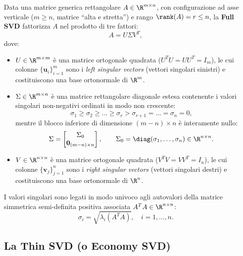 Data una matrice generica rettangolare $A \in \R^{m \times n}$, con configurazione ad asse verticale ($m \ge n$, matrice ``alta e stretta'') e rango $\rank(A) = r \le n$, la \textbf{Full SVD} fattorizza $A$ nel prodotto di tre fattori:
\begin{equation}
    A = U \Sigma V^T,
\end{equation}
dove:
\begin{itemize}
    \item $U \in \R^{m \times m}$ \`e una matrice ortogonale quadrata ($U^T U = U U^T = I_m$), le cui colonne $\{\mathbf{u}_i\}_{i=1}^m$ sono i \textit{left singular vectors} (vettori singolari sinistri) e costituiscono una base ortonormale di $\R^m$.
    \item $\Sigma \in \R^{m \times n}$ \`e una matrice rettangolare diagonale estesa contenente i valori singolari non-negativi ordinati in modo non crescente:
    \begin{equation}
        \sigma_1 \ge \sigma_2 \ge \dots \ge \sigma_r > \sigma_{r+1} = \dots = \sigma_n = 0,
    \end{equation}
    mentre il blocco inferiore di dimensione $(m - n) \times n$ \`e interamente nullo:
    \begin{equation}
        \Sigma = \begin{bmatrix} \Sigma_0 \\ \mathbf{0}_{(m-n) \times n} \end{bmatrix}, \qquad \Sigma_0 = \diag(\sigma_1, \dots, \sigma_n) \in \R^{n \times n}.
    \end{equation}
    \item $V \in \R^{n \times n}$ \`e una matrice ortogonale quadrata ($V^T V = V V^T = I_n$), le cui colonne $\{\mathbf{v}_j\}_{j=1}^n$ sono i \textit{right singular vectors} (vettori singolari destri) e costituiscono una base ortonormale di $\R^n$.
\end{itemize}

I valori singolari sono legati in modo univoco agli autovalori della matrice simmetrica semi-definita positiva associata $A^T A \in \R^{n \times n}$:
\begin{equation}
    \sigma_i = \sqrt{\lambda_i(A^T A)}, \quad i = 1, \dots, n.
\end{equation}

\subsection{La Thin SVD (o Economy SVD)}

